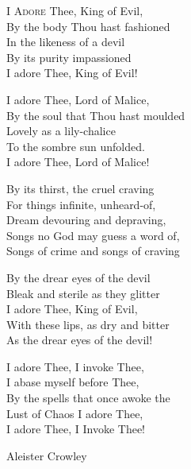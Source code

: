 \vspace*{\fill}

\begin{Verse}
I \textsc{Adore} Thee, King of Evil,\\
By the body Thou hast fashioned\\
In the likeness of a devil\\
By its purity impassioned\\
I adore Thee, King of Evil!

I adore Thee, Lord of Malice,\\
By the soul that Thou hast moulded\\
Lovely as a lily-chalice\\
To the sombre sun unfolded.\\
I adore Thee, Lord of Malice!

By its thirst, the cruel craving\\
For things infinite, unheard-of,\\
Dream devouring and depraving,\\
Songs no God may guess a word of,\\
Songs of crime and songs of craving \textemdash{}

By the drear eyes of the devil\\
Bleak and sterile as they glitter\\
I adore Thee, King of Evil,\\
With these lips, as dry and bitter\\
As the drear eyes of the devil!

I adore Thee, I invoke Thee,\\
I abase myself before Thee,\\
By the spells that once awoke the \\
Lust of Chaos I adore Thee, \\
I adore Thee, I Invoke Thee!

\centering
\textemdash{} Aleister Crowley
\par
\end{Verse}
\vspace*{\fill}

